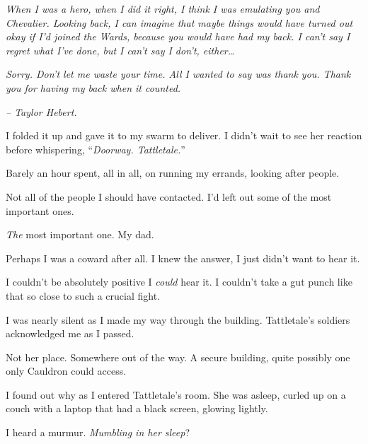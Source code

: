 \emph{When I was a hero, when I did it right, I think I was emulating you and Chevalier.  Looking back, I can imagine that maybe things would have turned out okay if I'd joined the Wards, because you would have had my back.  I can't say I regret what I've done, but I can't say I don't, either\ldots}



\emph{Sorry.  Don't let me waste your time.  All I wanted to say was thank you.  Thank you for having my back when it counted.}



\emph{– Taylor Hebert.}



I folded it up and gave it to my swarm to deliver.  I didn't wait to see her reaction before whispering, ``\emph{Doorway.  Tattletale.}''



\blacksquare



Barely an hour spent, all in all, on running my errands, looking after people.



Not all of the people I should have contacted.  I'd left out some of the most important ones.



\emph{The }most important one.  My dad.



Perhaps I was a coward after all.  I knew the answer, I just didn't want to hear it.



I couldn't be absolutely positive I \emph{could} hear it.  I couldn't take a gut punch like that so close to such a crucial fight.



I was nearly silent as I made my way through the building.  Tattletale's soldiers acknowledged me as I passed.



Not her place.  Somewhere out of the way.  A secure building, quite possibly one only Cauldron could access.



I found out why as I entered Tattletale's room.  She was asleep, curled up on a couch with a laptop that had a black screen, glowing lightly.



I heard a murmur.  \emph{Mumbling in her sleep}?



